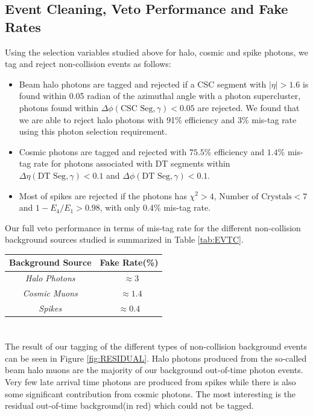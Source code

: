 \subsection{Event Cleaning, Veto Performance and Fake Rates}
Using the selection variables studied above for halo, cosmic and spike photons, we tag and reject non-collision events as follows: 
\begin{itemize}
\item Beam halo photons are tagged and rejected if a CSC segment with $|\eta| > 1.6$ is found within 0.05 radian of the azimuthal angle with a photon supercluster, \ie photons found within $\Delta\phi(\mbox{CSC Seg},\gamma) < 0.05$ are rejected. We found that we are able to reject halo photons with 91\% efficiency and 3\% mis-tag rate using this photon selection requirement.
\item Cosmic photons are tagged and rejected with $75.5$\% efficiency and $1.4$\% mis-tag rate for photons associated with DT segments within $\Delta\eta(\mbox{DT Seg},\gamma) < 0.1$ and $\Delta\phi(\mbox{DT Seg},\gamma) < 0.1$.
\item Most of spikes are rejected if the photons has $\chi^{2} > 4$, $\mbox{Number of Crystals} < 7$ and $ 1-E_{4}/E_{1} > 0.98$, with only $0.4$\% mis-tag rate.
\end{itemize}
Our full veto performance in terms of mis-tag rate for the different non-collision background sources studied  is summarized in Table \ref{tab:EVTC}.

\begin{minipage}{\linewidth} 
\begin{center}
\begin{tabular}{|c| c|}
\hline
\bfseries{Background Source} & \bfseries {Fake Rate}(\%)\\
\hline\hline
\textit{Halo Photons} & ~$\approx 3$ \\
\textit{Cosmic Muons} & ~$\approx 1.4$ \\
\textit{Spikes} & $\approx 0.4$ \\
\hline
\end{tabular}
\label{tab:EVTC} 
\end{center}
\end{minipage}
\paragraph*{}\mbox{}\\
The result of our tagging of the different types of non-collision background events can be seen in Figure \ref{fig:RESIDUAL}. Halo photons produced from the so-called beam halo muons are the majority of our background out-of-time photon events. Very few late arrival time photons are produced from spikes while there is also some significant contribution from cosmic photons. The most interesting is the residual out-of-time background(in red) which could not be tagged. 

